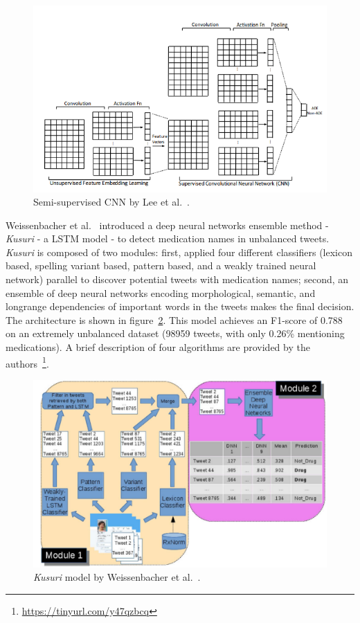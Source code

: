 \begin{figure}[h]
	\centering
	\includegraphics[width=0.99\linewidth]{Figures/l.png}
	\caption{Semi-supervised CNN by Lee et al.~\cite{lee2017adverse}.}
	\label{fig:architecture-lee}
\end{figure}

Weissenbacher et al.~\cite{weissenbacher2019deep} introduced a deep neural networks ensemble method - \textit{Kusuri} - a LSTM model - to detect medication names in unbalanced tweets. \textit{Kusuri} is composed of two modules: first, applied four different classifiers (lexicon based, spelling variant based, pattern based, and a weakly trained neural network) parallel to discover potential tweets with medication names; second, an ensemble of deep neural networks encoding morphological, semantic, and longrange dependencies of important words in the tweets makes the final decision. The architecture is shown in figure~\ref{fig:architecture-weissenbacher}. This model achieves an F1-score of 0.788 on an extremely unbalanced dataset (98959 tweets, with only 0.26\% mentioning medications). A brief description of four algorithms are provided by the authors~\footnote{\url{https://tinyurl.com/y47qzbcq}}.

\begin{figure}[h]
	\centering
	\includegraphics[width=0.99\linewidth]{Figures/a.png}
	\caption{\textit{Kusuri} model by Weissenbacher et al.~\cite{weissenbacher2019deep}.}
	\label{fig:architecture-weissenbacher}
\end{figure}

